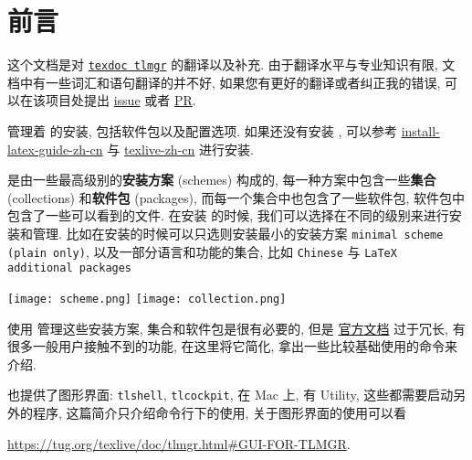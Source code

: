 \section*{前\quad 言}

这个文档是对 \href{https://mirrors.ctan.org/info/tlmgrbasics/doc/tlmgr.pdf}{\texttt{texdoc tlmgr}} 的翻译以及补充. 由于翻译水平与专业知识有限, 文档中有一些词汇和语句翻译的并不好, 如果您有更好的翻译或者纠正我的错误, 可以在该项目处提出 \href{https://github.com/syvshc/tlmgr-intro-zh-cn/issues}{issue} 或者 \href{https://github.com/syvshc/tlmgr-intro-zh-cn/pulls}{PR}. 

\tlmgr 管理着 \tl 的安装, 包括软件包以及配置选项. 如果还没有安装 \tl, 可以参考 \href{https://mirrors.ctan.org/info/install-latex-guide-zh-cn/install-latex-guide-zh-cn.pdf}{install-latex-guide-zh-cn} 与 \href{https://www.tug.org/texlive/doc/texlive-zh-cn/texlive-zh-cn.pdf}{texlive-zh-cn} 进行安装. 

\tl 是由一些最高级别的\textbf{安装方案} (schemes) 构成的, 每一种方案中包含一些\textbf{集合} (collections) 和\textbf{软件包} (packages), 而每一个集合中也包含了一些软件包, 软件包中包含了一些可以看到的文件. 在安装 \tl 的时候, 我们可以选择在不同的级别来进行安装和管理. 比如在安装的时候可以只选则安装最小的安装方案 \texttt{minimal scheme (plain only)}, 以及一部分语言和功能的集合, 比如 \texttt{Chinese} 与 \texttt{LaTeX additional packages}

\begin{center}
    \texttt{[image: scheme.png]} \quad 
    \texttt{[image: collection.png]}
\end{center}

使用 \tlmgr 管理这些安装方案, 集合和软件包是很有必要的, 但是 \href{https://www.tug.org/texlive/doc/tlmgr.html}{\tlmgr 官方文档} 过于冗长, 有很多一般用户接触不到的功能, 在这里将它简化, 拿出一些比较基础使用的命令来介绍. 

\tlmgr 也提供了图形界面: \texttt{tlshell}, \texttt{tlcockpit}, 在 Mac 上, 有 \tl{} Utility, 这些都需要启动另外的程序, 这篇简介只介绍命令行下的使用, 关于图形界面的使用可以看
\begin{center}
    \url{https://tug.org/texlive/doc/tlmgr.html#GUI-FOR-TLMGR}.
\end{center}